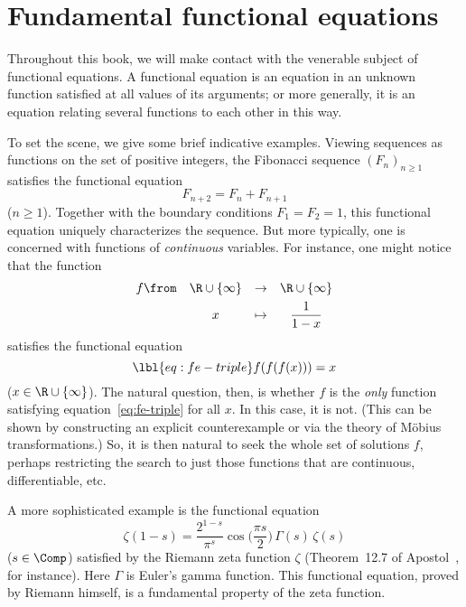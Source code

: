 \chapter{Fundamental functional equations}


Throughout this book, we will make contact with the venerable
subject of functional equations.  A functional%
%
%
equation is an equation in an unknown function satisfied at all values of
its arguments; or more generally, it is an equation relating several
functions to each other in this way.

To set the scene, we give some brief indicative examples.  Viewing
sequences as functions on the set of positive integers, the
Fibonacci%
%
% 
sequence $(F_n)_{n \geq 1}$ satisfies the functional equation
\[
F_{n + 2} = F_n + F_{n + 1} 
\]
($n \geq 1$).  Together with the boundary conditions $F_1 = F_2 = 1$, this
functional equation uniquely characterizes the sequence.  But more
typically, one is concerned with functions of \emph{continuous} variables.
For instance, one might notice that the function
\[
\begin{array}{cccc}
f\from  &\R \cup \{\infty\}     &\to            &\R\cup\{\infty\}\\[1ex]
        &x                      &\mapsto        &
\displaystyle\frac{1}{1 - x}
\end{array}
\]
satisfies the functional equation
% 
\begin{equation}
\lbl{eq:fe-triple}
f(f(f(x))) = x
\end{equation}
% 
($x \in \R \cup \{\infty\}$).  The natural question, then, is whether $f$
is the \emph{only} function satisfying equation~\eqref{eq:fe-triple} for
all $x$.  In this case, it is not.  (This can be shown by constructing an
explicit counterexample or via the theory of M\"obius
transformations.)  So, it is then natural to seek the whole set of
solutions $f$, perhaps restricting the search to just those functions that
are continuous, differentiable, etc.

A more sophisticated example is the functional equation
% 
\[
\zeta(1 - s) 
=
\frac{2^{1 - s}}{\pi^s} 
\cos\biggl(\frac{\pi s}{2}\biggr)\,\Gamma(s)\,\zeta(s)
\]
% 
($s \in \Comp$) satisfied by the Riemann%
%
% 
zeta function $\zeta$ (Theorem~12.7 of Apostol~\cite{AposIAN}, for
instance).  Here $\Gamma$ is Euler's gamma function.  This functional
equation, proved by Riemann himself, is a fundamental property of the zeta
function.

